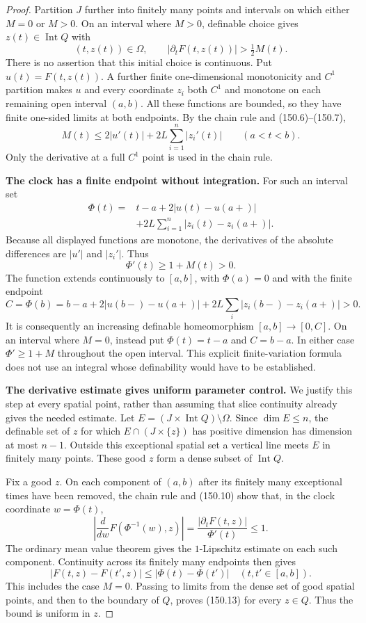 \begin{proof}
Partition $J$ further into finitely many points and intervals on
which either $M=0$ or $M>0$. On an interval where $M>0$, definable
choice gives $z(t)\in\operatorname{Int}Q$ with
\[
 (t,z(t))\in\Omega,\qquad
 |\partial_tF(t,z(t))|>\tfrac12 M(t).
 \tag{150.7}
\]
There is no assertion that this initial choice is continuous.
Put $u(t)=F(t,z(t))$. A further finite one-dimensional monotonicity
and $C^1$ partition makes $u$ and every coordinate $z_i$ both $C^1$
and monotone on each remaining open interval $(a,b)$. All these
functions are bounded, so they have finite one-sided limits at
both endpoints. By the chain rule and (150.6)--(150.7),
\[
 M(t)\le 2|u'(t)|+2L\sum_{i=1}^n|z_i'(t)|
 \qquad(a<t<b).
 \tag{150.8}
\]
Only the derivative at a full $C^1$ point is used in the chain rule.

\textbf{The clock has a finite endpoint without integration.}\quad
For such an interval set
\[
 \begin{split}
 \Phi(t)={}&t-a+2|u(t)-u(a+)|\\
           &+2L\sum_{i=1}^n|z_i(t)-z_i(a+)|.
 \end{split}
 \tag{150.9}
\]
Because all displayed functions are monotone, the derivatives of
the absolute differences are $|u'|$ and $|z_i'|$. Thus
\[
 \Phi'(t)\ge1+M(t)>0.
 \tag{150.10}
\]
The function extends continuously to $[a,b]$, with $\Phi(a)=0$
and with the finite endpoint
\[
 C=\Phi(b)=b-a+2|u(b-)-u(a+)|
              +2L\sum_i|z_i(b-)-z_i(a+)|>0.
 \tag{150.11}
\]
It is consequently an increasing definable homeomorphism
$[a,b]\to[0,C]$. On an interval where $M=0$, instead put
$\Phi(t)=t-a$ and $C=b-a$. In either case
$\Phi'\ge1+M$ throughout the open interval.
This explicit finite-variation formula does not use an integral
whose definability would have to be established.

\textbf{The derivative estimate gives uniform parameter control.}\quad
We justify this step at every spatial point, rather than assuming
that slice continuity already gives the needed estimate.
Let $E=(J\times\operatorname{Int}Q)\setminus\Omega$.
Since $\dim E\le n$, the definable set of $z$ for which
$E\cap(J\times\{z\})$ has positive dimension has dimension at
most $n-1$. Outside this exceptional spatial set a vertical line
meets $E$ in finitely many points. These good $z$ form a dense subset
of $\operatorname{Int}Q$.

Fix a good $z$. On each component of $(a,b)$ after its finitely many
exceptional times have been removed, the chain rule and (150.10)
show that, in the clock coordinate $w=\Phi(t)$,
\[
 \left|\frac{d}{dw}F(\Phi^{-1}(w),z)\right|
   =\frac{|\partial_tF(t,z)|}{\Phi'(t)}\le1.
 \tag{150.12}
\]
The ordinary mean value theorem gives the $1$-Lipschitz estimate
on each such component. Continuity across its finitely many endpoints
then gives
\[
 |F(t,z)-F(t',z)|\le|\Phi(t)-\Phi(t')|
 \quad(t,t'\in[a,b]).
 \tag{150.13}
\]
This includes the case $M=0$. Passing to limits from the dense set
of good spatial points, and then to the boundary of $Q$, proves
(150.13) for every $z\in Q$. Thus the bound is uniform in $z$.


\end{proof}
